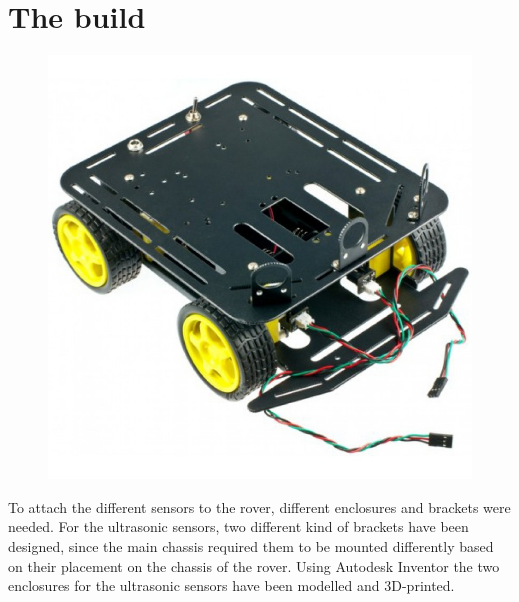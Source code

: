 \clearpage
\section{The build}

\begin{figure}[H]
	\centering
	\includegraphics[width=.4\linewidth]{images/chassis.jpg}
\end{figure}

To attach the different sensors to the rover, different enclosures and brackets were needed. For the ultrasonic sensors, two different kind of brackets have been designed, since the main chassis required them to be mounted differently based on their placement on the chassis of the rover. Using Autodesk Inventor the two enclosures for the ultrasonic sensors have been modelled and 3D-printed.

